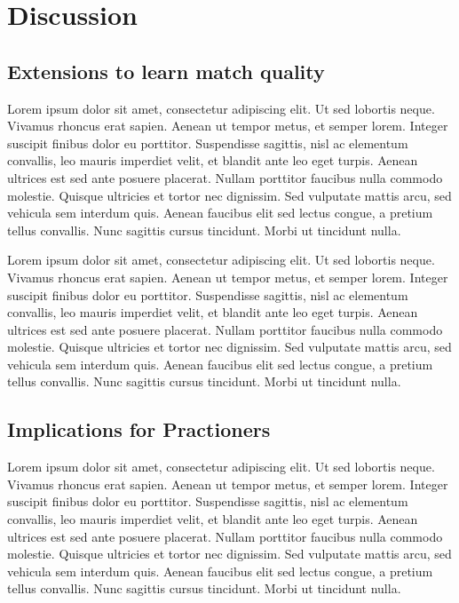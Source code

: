 \section{Discussion}
\subsection{Extensions to learn match quality}
Lorem ipsum dolor sit amet, consectetur adipiscing elit. Ut sed lobortis neque. Vivamus rhoncus erat sapien. Aenean ut tempor metus, et semper lorem. Integer suscipit finibus dolor eu porttitor. Suspendisse sagittis, nisl ac elementum convallis, leo mauris imperdiet velit, et blandit ante leo eget turpis. Aenean ultrices est sed ante posuere placerat. Nullam porttitor faucibus nulla commodo molestie. Quisque ultricies et tortor nec dignissim. Sed vulputate mattis arcu, sed vehicula sem interdum quis. Aenean faucibus elit sed lectus congue, a pretium tellus convallis. Nunc sagittis cursus tincidunt. Morbi ut tincidunt nulla.

Lorem ipsum dolor sit amet, consectetur adipiscing elit. Ut sed lobortis neque. Vivamus rhoncus erat sapien. Aenean ut tempor metus, et semper lorem. Integer suscipit finibus dolor eu porttitor. Suspendisse sagittis, nisl ac elementum convallis, leo mauris imperdiet velit, et blandit ante leo eget turpis. Aenean ultrices est sed ante posuere placerat. Nullam porttitor faucibus nulla commodo molestie. Quisque ultricies et tortor nec dignissim. Sed vulputate mattis arcu, sed vehicula sem interdum quis. Aenean faucibus elit sed lectus congue, a pretium tellus convallis. Nunc sagittis cursus tincidunt. Morbi ut tincidunt nulla.

\subsection{Implications for Practioners}
Lorem ipsum dolor sit amet, consectetur adipiscing elit. Ut sed lobortis neque. Vivamus rhoncus erat sapien. Aenean ut tempor metus, et semper lorem. Integer suscipit finibus dolor eu porttitor. Suspendisse sagittis, nisl ac elementum convallis, leo mauris imperdiet velit, et blandit ante leo eget turpis. Aenean ultrices est sed ante posuere placerat. Nullam porttitor faucibus nulla commodo molestie. Quisque ultricies et tortor nec dignissim. Sed vulputate mattis arcu, sed vehicula sem interdum quis. Aenean faucibus elit sed lectus congue, a pretium tellus convallis. Nunc sagittis cursus tincidunt. Morbi ut tincidunt nulla.

